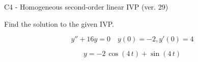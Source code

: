\begin{exercise}
  \begin{exerciseTitle}C4 - Homogeneous second-order linear IVP (ver. 29)\end{exerciseTitle}
  \begin{exerciseStatement}
    
Find the solution to the given IVP.

    
\[y''+16y = 0 \hspace{1em} y(0) = -2 , y'(0) = 4\]

  \end{exerciseStatement}
  \begin{exerciseAnswer}
    
\[y= -2 \, \cos\left(4 \, t\right) + \sin\left(4 \, t\right)\]

  \end{exerciseAnswer}
\end{exercise}